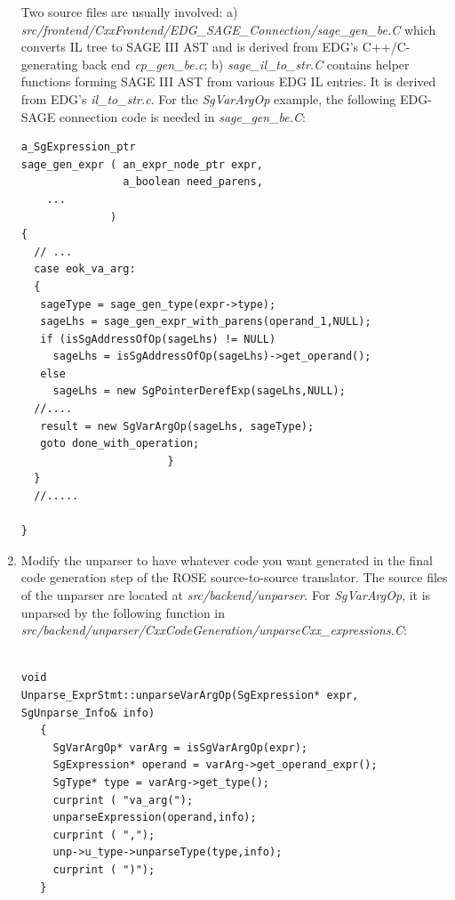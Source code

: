 \begin{enumerate}
           Two source files are usually involved: a)
           \textit{src/frontend/CxxFrontend/EDG\_SAGE\_Connection/sage\_gen\_be.C}
           which converts IL tree to SAGE III AST and is derived from EDG's 
           C++/C-generating back end \textit{cp\_gen\_be.c}; b)
           \textit{sage\_il\_to\_str.C} contains helper functions forming SAGE
           III AST from various EDG IL entries. It is derived from EDG's
           \textit{il\_to\_str.c}.  For the {\em SgVarArgOp} example, the
           following EDG-SAGE connection code is needed in
           \textit{sage\_gen\_be.C}:
{\indent
{\mySmallFontSize
\begin{verbatim}
a_SgExpression_ptr
sage_gen_expr ( an_expr_node_ptr expr, 
                a_boolean need_parens, 
    ...
              )
{
  // ...
  case eok_va_arg:
  {
   sageType = sage_gen_type(expr->type);
   sageLhs = sage_gen_expr_with_parens(operand_1,NULL);
   if (isSgAddressOfOp(sageLhs) != NULL)
     sageLhs = isSgAddressOfOp(sageLhs)->get_operand();
   else
     sageLhs = new SgPointerDerefExp(sageLhs,NULL);
  //....
   result = new SgVarArgOp(sageLhs, sageType);
   goto done_with_operation;
                       }
  }
  //.....

}
\end{verbatim} 
}}

     \item Modify the unparser to have whatever code you want generated in the final
           code generation step of the ROSE source-to-source translator.
           The source files of the unparser are located at
           \textit{src/backend/unparser}. For {\em SgVarArgOp}, it is
           unparsed by the following function in
           \textit{src/backend/unparser/CxxCodeGeneration/unparseCxx\_expressions.C}:

{\indent
{\mySmallFontSize
\begin{verbatim}

void
Unparse_ExprStmt::unparseVarArgOp(SgExpression* expr, SgUnparse_Info& info)
   {
     SgVarArgOp* varArg = isSgVarArgOp(expr);
     SgExpression* operand = varArg->get_operand_expr();
     SgType* type = varArg->get_type();
     curprint ( "va_arg(");
     unparseExpression(operand,info);
     curprint ( ",");
     unp->u_type->unparseType(type,info);
     curprint ( ")");
   }
\end{verbatim} 
}}



\end{enumerate}

